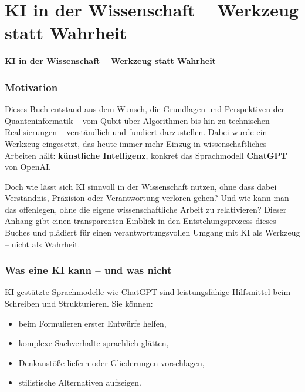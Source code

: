 \cleardoublepage

\renewcommand{\thesection}{\thechapter.\arabic{section}}
\renewcommand{\thechapter}{C}

\chapter{KI in der Wissenschaft – Werkzeug statt Wahrheit}
\vspace{1em}
\begin{center}
	\LARGE\textbf{KI in der Wissenschaft – Werkzeug statt Wahrheit}
\end{center}

\subsection*{Motivation}
Dieses Buch entstand aus dem Wunsch, die Grundlagen und Perspektiven der Quanteninformatik – vom Qubit über Algorithmen bis hin zu technischen Realisierungen – verständlich und fundiert darzustellen. 
Dabei wurde ein Werkzeug eingesetzt, das heute immer mehr Einzug in wissenschaftliches Arbeiten hält: \textbf{künstliche Intelligenz}, konkret das Sprachmodell \textbf{ChatGPT} von OpenAI.

Doch wie lässt sich KI sinnvoll in der Wissenschaft nutzen, ohne dass dabei Verständnis, Präzision oder Verantwortung verloren gehen? Und wie kann man das offenlegen, ohne die eigene wissenschaftliche Arbeit zu relativieren? Dieser Anhang gibt einen transparenten Einblick in den Entstehungsprozess dieses Buches und plädiert für einen verantwortungsvollen Umgang mit KI als Werkzeug – nicht als Wahrheit.

\subsection*{Was eine KI kann – und was nicht}
KI-gestützte Sprachmodelle wie ChatGPT sind leistungsfähige Hilfsmittel beim Schreiben und Strukturieren. Sie können:
\begin{itemize}
	\item beim Formulieren erster Entwürfe helfen,
	\item komplexe Sachverhalte sprachlich glätten,
	\item Denkanstöße liefern oder Gliederungen vorschlagen,
	\item stilistische Alternativen aufzeigen.
\end{itemize}

